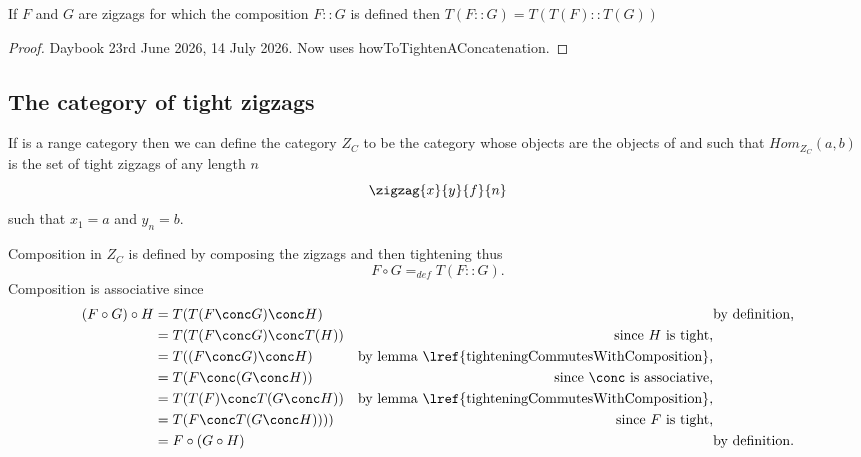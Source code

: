 \begin{lemma}
If $F$ and $G$ are zigzags for which the composition $F::G$ is defined
then 
$ T(F :: G) = T(T(F) :: T(G)) $
\end{lemma}


\newcommand{\tightenedComposite}[1]
{
\zigzagOneAndAHalf{w}{x}{#1}
\begin{array}{c}
\dots \\[0.8cm]
\dots
\end{array}
\begin{array}{c c}
\Ob{x}{n} \\[0.8cm]
& \Ob{w}{n}=
\end{array}
\begin{arrows}
\ncarr{xn}{wn} \blabel{#1'_{n-1}}[0.2][0.4] %
\end{arrows}
\kern-15pt
\arraycolsep=7pt
\zigzagFlex{y}{z}{#1}{n}{n+m}
}

\begin{proof}
Daybook 23rd June 2026, 14 July 2026.
Now uses howToTightenAConcatenation. 
\end{proof}


\subsection{The category of tight zigzags}
If \catcw is a range category then we can define the category
$Z_C$ to be the category whose objects are the objects of \catcw
and such that $Hom_{Z_C}(a,b)$ is the set of tight zigzags of any length $n$
$$
\arraycolsep=7pt
\zigzag{x}{y}{f}{n}
$$
such that $x_1=a$ and $y_n=b$.


Composition in $Z_C$ is defined by composing the zigzags and then tightening  thus
\[
F \circ G =_{def} T(F :: G).
\]
Composition is associative since 
\begin{align*}
(F \circ G) \circ H 
                &= T(T(F \conc G) \conc H) &&   \mbox{by definition,} \\
                &= T(T(F \conc G) \conc T(H))
                        &\mbox{since $H$ is tight,}\\
                &= T((F \conc G) \conc H)  
                        &\mbox{by lemma \lref{tighteningCommutesWithComposition},}\\
                &= T(F \conc (G \conc H))
                        &\mbox {since $\conc$ is associative,} \\
                &= T(T(F) \conc T(G \conc H))       
                        &\mbox{by lemma \lref{tighteningCommutesWithComposition},}\\
                &= T(F \conc T(G \conc H))))
                        &\mbox{since $F$ is tight,} \\
                &= F \circ (G \circ H) &&   \mbox{by definition.}                 
\end{align*}

